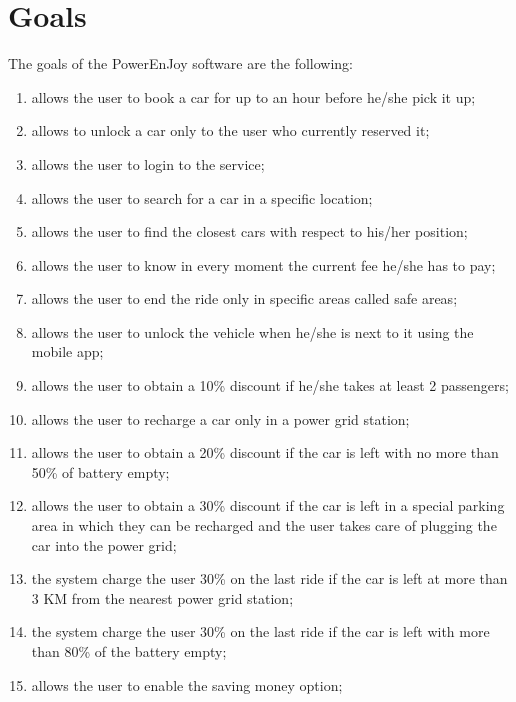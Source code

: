 \section{Goals}
The goals of the PowerEnJoy software are the following:
\begin{enumerate}
	\item allows the user to book a car for up to an hour before he/she pick it up;
	\item allows to unlock a car only to the user who currently reserved it;
	\item allows the user to login to the service;
	\item allows the user to search for a car in a specific location; 
	\item allows the user to find the closest cars with respect to his/her position; 
	\item allows the user to know in every moment the current fee he/she has to pay;
	\item allows the user to end the ride only in specific areas called safe areas;
	\item allows the user to unlock the vehicle when he/she is next to it using the mobile app;
	\item allows the user to obtain a 10\% discount if he/she takes at least 2 passengers;
	\item allows the user to recharge a car only in a power grid station;
	\item allows the user to obtain a 20\% discount if the car is left with no more than 50\% of battery empty;
	\item allows the user to obtain a 30\% discount if the car is left in a special parking area in which they can be recharged and the user takes care of plugging the car into the power grid;
	\item the system charge the user 30\% on the last ride if the car is left at more than 3 KM from the nearest power grid station;
	\item the system charge the user 30\% on the last ride if the car is left with more than 80\% of the battery empty;
	\item allows the user to enable the saving money option;
	
	
\end{enumerate}